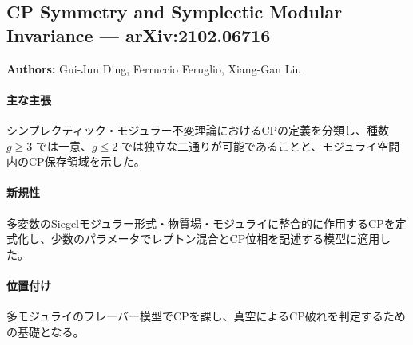 \subsection{CP Symmetry and Symplectic Modular Invariance --- arXiv:2102.06716}

\textbf{Authors:} Gui-Jun Ding, Ferruccio Feruglio, Xiang-Gan Liu

\paragraph{主な主張}
シンプレクティック・モジュラー不変理論におけるCPの定義を分類し、種数 $g\geq3$ では一意、$g\leq2$ では独立な二通りが可能であることと、モジュライ空間内のCP保存領域を示した\cite{Ding:2021iqp}。

\paragraph{新規性}
多変数のSiegelモジュラー形式・物質場・モジュライに整合的に作用するCPを定式化し、少数のパラメータでレプトン混合とCP位相を記述する模型に適用した。

\paragraph{位置付け}
多モジュライのフレーバー模型でCPを課し、真空によるCP破れを判定するための基礎となる。

